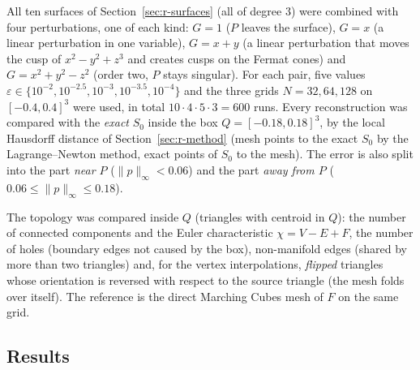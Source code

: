\documentclass[12pt, a4paper]{article}
\theoremstyle{plain}
\theoremstyle{definition}
\theoremstyle{remark}
\theoremstyle{definition}
\begin{document}
All ten surfaces of Section~\ref{sec:r-surfaces} (all of degree $3$) were combined
with four perturbations, one of each kind: $G=1$ ($P$ leaves the surface), $G=x$
(a linear perturbation in one variable), $G=x+y$ (a linear perturbation that moves
the cusp of $x^2-y^2+z^3$ and creates cusps on the Fermat cones) and
$G=x^2+y^2-z^2$ (order two, $P$ stays singular). For each pair, five values
$\varepsilon\in\{10^{-2},10^{-2.5},10^{-3},10^{-3.5},10^{-4}\}$ and the three grids
$N=32,64,128$ on $[-0.4,0.4]^3$ were used, in total $10\cdot4\cdot5\cdot3=600$
runs. Every reconstruction was compared with the \emph{exact} $S_0$ inside the box
$Q=[-0.18,0.18]^3$, by the local Hausdorff distance of
Section~\ref{sec:r-method} (mesh points to the exact $S_0$ by the Lagrange--Newton
method, exact points of $S_0$ to the mesh). The error is also split into the part
\emph{near $P$} ($\|p\|_\infty<0.06$) and the part \emph{away from $P$}
($0.06\le\|p\|_\infty\le0.18$).

The topology was compared inside $Q$ (triangles with centroid in $Q$): the number
of connected components and the Euler characteristic $\chi=V-E+F$, the number of
holes (boundary edges not caused by the box), non-manifold edges (shared by more
than two triangles) and, for the vertex interpolations, \emph{flipped} triangles
whose orientation is reversed with respect to the source triangle (the mesh folds
over itself). The reference is the direct Marching Cubes mesh of $F$ on the same
grid. 

\subsection{Results}
\label{sec:r-interp-results}
\end{document}
